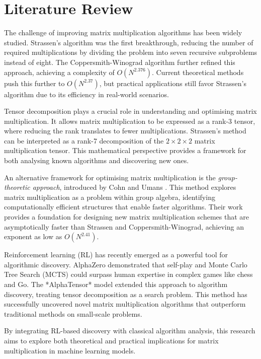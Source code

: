 \documentclass{article}
\begin{document}
\section{Literature Review}
The challenge of improving matrix multiplication algorithms has been widely studied. Strassen's algorithm \cite{strassen1969gaussian} was the first breakthrough, reducing the number of required multiplications by dividing the problem into seven recursive subproblems instead of eight. The Coppersmith-Winograd algorithm \cite{coppersmith1990matrix} further refined this approach, achieving a complexity of \( O(N^{2.376}) \). Current theoretical methods push this further to \( O(N^{2.37}) \), but practical applications still favor Strassen's algorithm due to its efficiency in real-world scenarios.  

Tensor decomposition plays a crucial role in understanding and optimising matrix multiplication. It allows matrix multiplication to be expressed as a rank-3 tensor, where reducing the rank translates to fewer multiplications. Strassen's method can be interpreted as a rank-7 decomposition of the \( 2 \times 2 \times 2 \) matrix multiplication tensor. This mathematical perspective provides a framework for both analysing known algorithms and discovering new ones.  

An alternative framework for optimising matrix multiplication is the \textit{group-theoretic approach}, introduced by Cohn and Umans \cite{cohn2005group}. This method explores matrix multiplication as a problem within group algebra, identifying computationally efficient structures that enable faster algorithms. Their work provides a foundation for designing new matrix multiplication schemes that are asymptotically faster than Strassen and Coppersmith-Winograd, achieving an exponent as low as \( O(N^{2.41}) \).

Reinforcement learning (RL) has recently emerged as a powerful tool for algorithmic discovery. AlphaZero demonstrated that self-play and Monte Carlo Tree Search (MCTS) could surpass human expertise in complex games like chess and Go. The *AlphaTensor* model \cite{fawzi2022discovering} extended this approach to algorithm discovery, treating tensor decomposition as a search problem. This method has successfully uncovered novel matrix multiplication algorithms that outperform traditional methods on small-scale problems.  

By integrating RL-based discovery with classical algorithm analysis, this research aims to explore both theoretical and practical implications for matrix multiplication in machine learning models.
\end{document}
